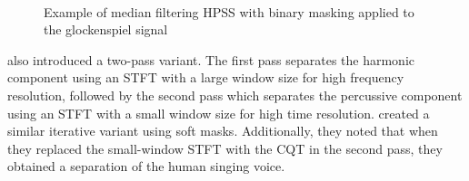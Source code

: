 \documentclass[report.tex]{subfiles}
\begin{document}
\begin{figure}[ht]
	\centering
	\hspace{0.1em}
	\\
	\hspace{0.1em}
	\caption{Example of median filtering HPSS with binary masking applied to the glockenspiel signal}
	\label{fig:fitz1}
\end{figure}

\textcite{driedger} also introduced a two-pass variant. The first pass separates the harmonic component using an STFT with a large window size for high frequency resolution, followed by the second pass which separates the percussive component using an STFT with a small window size for high time resolution. \textcite{fitzgerald2} created a similar iterative variant using soft masks. Additionally, they noted that when they replaced the small-window STFT with the CQT in the second pass, they obtained a separation of the human singing voice.
\end{document}
